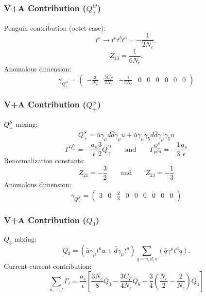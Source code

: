 \documentclass{beamer}
\begin{document}
\begin{frame}
\frametitle{V+A Contribution ($Q^O_+$)}
Penguin contribution (octet case):
\begin{equation*}
	t^a \rightarrow t^at^bt^a = -\frac{1}{2N_c},
\end{equation*}
\begin{equation*}
	Z_{13} = \frac{1}{6N_c}. 
\end{equation*}
Anomalous dimension:
\begin{equation*}
	\gamma_{Q^O_+} = 
	\begin{pmatrix}
		-\frac{3}{N_c} & \frac{3C_F}{2N_c} & - \frac{1}{3N_c} & 0 & 0 & 0 & 0 & 0 & 0
	\end{pmatrix}
\end{equation*}
\end{frame}

\begin{frame}
\frametitle{V+A Contribution ($Q^S_+$)}
$Q^S_+$ mixing:
\begin{equation*}
	Q^S_+ = \bar u \gamma_\mu d \bar d \gamma_\mu u + \bar u \gamma_\mu \gamma_5 d \bar d \gamma_\mu \gamma_5 u
\end{equation*}
\begin{equation*}
	 \Gamma^{Q^S_+} = -\frac{a_s}{\epsilon} \frac{3}{2} Q^O_{+} \qquad \text{and} \qquad \Gamma^{Q^S_+}_{pen} = -\frac{1}{3} \frac{a_s}{\epsilon}  
\end{equation*}
Renormalization constants:
\begin{equation*}
	Z_{21} = -\frac{3}{2} \qquad \text{and} \qquad Z_{23} = -\frac{1}{3}
\end{equation*}
Anomalous dimension:
\begin{equation*}
	\gamma_{Q^S_+} = 
	\begin{pmatrix}
		3 & 0 & \frac{2}{3} & 0 & 0 & 0 & 0 & 0 & 0
	\end{pmatrix}
\end{equation*}
\end{frame}

\begin{frame}
\frametitle{V+A Contribution ($Q_3$)}
$Q_3$ mixing:
\begin{equation*}
	Q_3 = (\bar u\gamma_\mu t^a u + \bar d \gamma_\mu t^a) \sum_{q=u,d,s} (\bar q \gamma^\mu t^a q).  	
\end{equation*}
Current-current contribution:
\begin{equation*}
	\sum_{a,\ldots,f} \Gamma_i = \frac{a_s}{\epsilon} \left[\frac{3N_c}{8}Q_3 - \frac{3C_F}{4N_c}Q_6 - \frac{3}{4}\left(\frac{N_c}{2} - \frac{2}{N_c}\right)Q_4 \right]
\end{equation*}
\end{frame}
\end{document}
